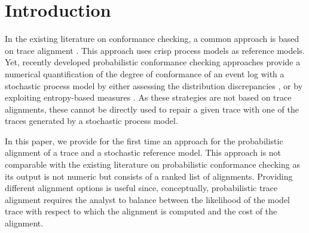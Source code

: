 \section{Introduction}


\label{introduction}
%
In the existing literature on conformance checking, a common approach is based on trace alignment \cite{DBLP:conf/edoc/AdriansyahDA11}. This approach uses crisp process models as reference models. Yet, recently developed probabilistic conformance checking approaches provide a numerical quantification of the degree of conformance
of an event log with a stochastic process model by either assessing the distribution discrepancies \cite{DBLP:conf/bpm/LeemansSA19}, or by exploiting entropy-based measures \cite{DBLP:conf/icpm/PolyvyanyyK19,DBLP:journals/tosem/PolyvyanyySWCM20}.
As these strategies are not based on trace alignments, these cannot be directly used to repair a given trace with one of the traces generated by a stochastic process model.

In this paper, we provide for the first time an approach for the probabilistic alignment of a trace and a stochastic reference
model. This approach is not comparable with the existing literature on probabilistic conformance checking as its output is not numeric but consists of a ranked list of alignments.
Providing different alignment options is useful since, conceptually, probabilistic trace alignment requires the analyst to 
balance between the likelihood of the model trace with respect to which the alignment is computed and the cost of the alignment. 

